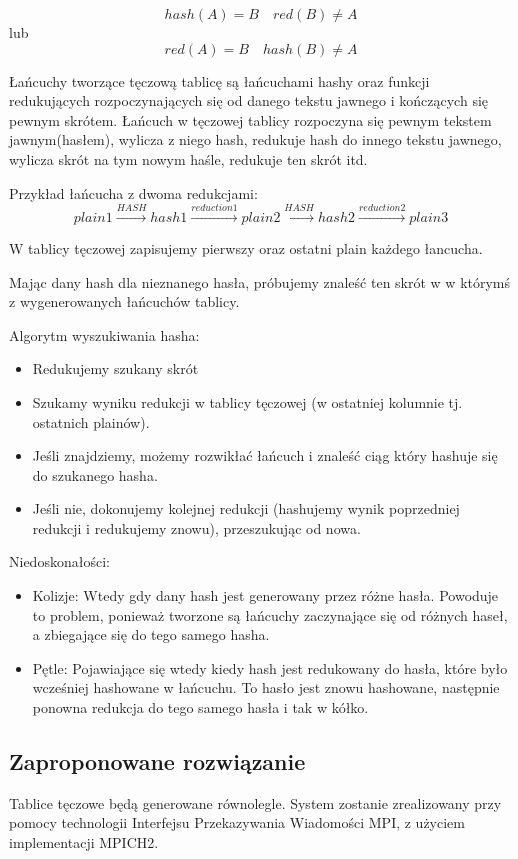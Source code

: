 \documentclass[a4paper,11pt]{article}
\begin{document}
\[	
	hash(A) = B \quad
	red(B) \neq A
\]
	lub
\[
	red(A) = B \quad
	hash(B) \neq A
\]
	
Łańcuchy tworzące tęczową tablicę są łańcuchami hashy oraz funkcji redukujących rozpoczynających się od danego tekstu jawnego i kończących się pewnym skrótem. Łańcuch w tęczowej tablicy rozpoczyna się pewnym tekstem jawnym(hasłem), wylicza z niego hash, redukuje hash do innego tekstu jawnego, wylicza skrót na tym nowym haśle, redukuje ten skrót itd.

Przykład łańcucha z dwoma redukcjami:
\[
	plain1 \xrightarrow{HASH} hash1 \xrightarrow{reduction 1} plain2 \xrightarrow{HASH} hash2 \xrightarrow{reduction 2} plain3
\]

W tablicy tęczowej zapisujemy pierwszy oraz ostatni plain każdego łancucha.

Mając dany hash dla nieznanego hasła, próbujemy znaleść ten skrót w w którymś z wygenerowanych łańcuchów tablicy.

Algorytm wyszukiwania hasha:
\begin{itemize}
  \item Redukujemy szukany skrót
  \item Szukamy wyniku redukcji w tablicy tęczowej (w ostatniej kolumnie tj. ostatnich plainów).
  \item Jeśli znajdziemy, możemy rozwikłać łańcuch i znaleść ciąg który hashuje się do szukanego hasha.
  \item Jeśli nie, dokonujemy kolejnej redukcji (hashujemy wynik poprzedniej redukcji i redukujemy znowu), przeszukując od nowa.
\end{itemize}

Niedoskonałości:
\begin{itemize}
  \item Kolizje: Wtedy gdy dany hash jest generowany przez różne hasła. Powoduje to problem, ponieważ tworzone są łańcuchy zaczynające się od różnych haseł, a zbiegające się do tego samego hasha.
  \item Pętle: Pojawiające się wtedy kiedy hash jest redukowany do hasła, które było wcześniej hashowane w łańcuchu. To hasło jest znowu hashowane, następnie ponowna redukcja do tego samego hasła i tak w kółko.
\end{itemize}

\subsection{Zaproponowane rozwiązanie}
Tablice tęczowe będą generowane równolegle. System zostanie zrealizowany przy pomocy technologii Interfejsu Przekazywania Wiadomości MPI, z użyciem implementacji MPICH2.
\end{document}
